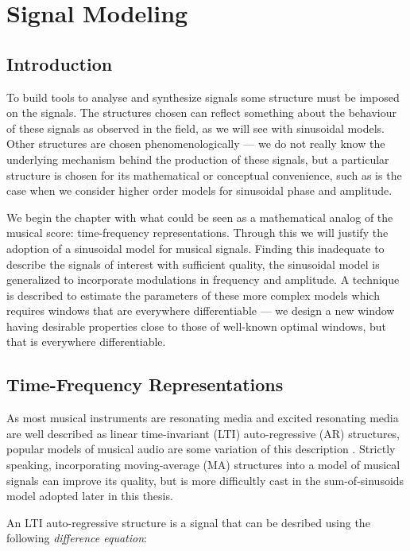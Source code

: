 \chapter{Signal Modeling\label{chap:sigmod}}

\section{Introduction}

To build tools to analyse and synthesize signals some structure must be imposed
on the signals. The structures chosen can reflect something about the behaviour
of these signals as observed in the field, as we will see with sinusoidal
models. Other structures are chosen phenomenologically --- we do not really know
the underlying mechanism behind the production of these signals, but a
particular structure is chosen for its mathematical or conceptual convenience,
such as is the case when we consider higher order models for sinusoidal phase
and amplitude.

We begin the chapter with what could be seen as a mathematical analog of the
musical score: time-frequency representations. Through this we will justify the
adoption of a sinusoidal model for musical signals. Finding this inadequate to
describe the signals of interest with sufficient quality, the sinusoidal model
is generalized to incorporate modulations in frequency and amplitude. A
technique is described to estimate the parameters of these more complex models
which requires windows that are everywhere differentiable --- we design a new
window having desirable properties close to those of well-known optimal windows,
but that is everywhere differentiable.

\section{Time-Frequency Representations \label{sec:timefreqrep}}

As most musical instruments are resonating media and excited resonating media
are well described as linear time-invariant (LTI) auto-regressive (AR)
structures, popular models of musical audio are some variation of this
description \cite{fletcher2012physics}. Strictly speaking, incorporating
moving-average (MA) structures into a model of musical signals can improve its
quality, but is more difficultly cast in the sum-of-sinusoids model adopted
later in this thesis.

An LTI auto-regressive structure is a signal that can be desribed using the
following \textit{difference equation}:

